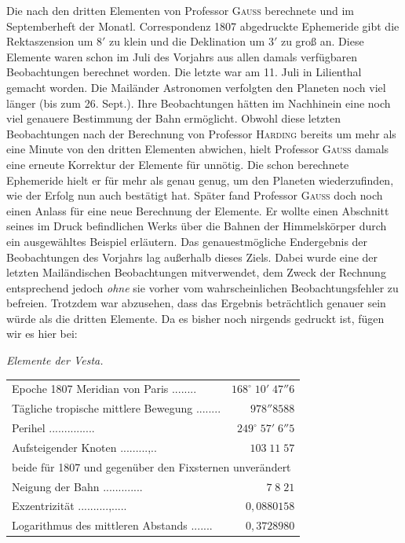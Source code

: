 \par\indent Die nach den dritten Elementen von Professor \textsc{Gauss} berechnete und im Septemberheft der Monatl. Correspondenz 1807 abgedruckte Ephemeride gibt die Rektaszension um $8'$ zu klein und die Deklination um $3'$ zu groß an. Diese Elemente waren schon im Juli des Vorjahrs aus allen damals verfügbaren Beobachtungen berechnet worden. Die letzte war am 11. Juli in Lilienthal gemacht worden. Die Mailänder Astronomen verfolgten den Planeten noch viel länger (bis zum 26. Sept.). Ihre Beobachtungen hätten im Nachhinein eine noch viel genauere Bestimmung der Bahn ermöglicht. Obwohl diese letzten Beobachtungen nach der Berechnung von Professor \textsc{Harding} bereits um mehr als eine Minute von den dritten Elementen abwichen, hielt Professor \textsc{Gauss} damals eine erneute Korrektur der Elemente für unnötig. Die schon berechnete Ephemeride hielt er für mehr als genau genug, um den Planeten wiederzufinden, wie der Erfolg nun auch bestätigt hat. Später fand Professor \textsc{Gauss} doch noch einen Anlass für eine neue Berechnung der Elemente. Er wollte einen Abschnitt seines im Druck befindlichen Werks über die Bahnen der Himmelskörper durch ein ausgewähltes Beispiel erläutern. Das genauestmögliche Endergebnis der Beobachtungen des Vorjahrs lag außerhalb dieses Ziels. Dabei wurde eine der letzten Mailändischen Beobachtungen mitverwendet, dem Zweck der Rechnung entsprechend jedoch \emph{ohne} sie vorher vom wahrscheinlichen Beobachtungsfehler zu befreien. Trotzdem war abzusehen, dass das Ergebnis beträchtlich genauer sein würde als die dritten Elemente. Da es bisher noch nirgends gedruckt ist, fügen wir es hier bei:

\begin{center}
\emph{Elemente der Vesta.}
\end{center}


\begin{center}\fontsize{9}{11}\selectfont\setlength{\tabcolsep}{3pt}\renewcommand{\arraystretch}{1.15}\begin{tabular}{lr}
Epoche 1807 Meridian von Paris .\;.\;.\;.\;.\;.\;.\;.\; & $168^\circ\;10'\;47''6$\\
Tägliche tropische mittlere Bewegung .\;.\;.\;.\;.\;.\;.\;.\; & $978''8588$\\
Perihel .\;.\;.\;.\;.\;.\;.\;.\;.\;.\;.\;.\;.\;.\;.\; & $249^\circ\;57'\;6''5$\\
Aufsteigender Knoten .\;.\;.\;.\;.\;.\;.\;.\;.\;,\;.\;.\; & $103\;11\;57$\\
\multicolumn{2}{l}{\quad beide für 1807 und gegenüber den Fixsternen unverändert}\\
Neigung der Bahn .\;.\;.\;.\;.\;.\;.\;.\;.\;.\;.\;.\;.\; & $7\;8\;21$\\
Exzentrizität .\;.\;.\;.\;.\;.\;.\;.\;.\;.\;,\;.\;.\;.\;.\;.\; & $0{,}0880158$\\
Logarithmus des mittleren Abstands .\;.\;.\;\hspace{.5em}.\;.\;.\;.\; & $0{,}3728980$\\
\end{tabular}\end{center}


